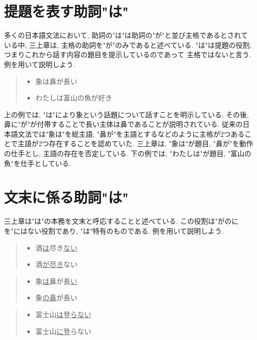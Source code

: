 \documentclass{jreport}
\begin{document}
\section{提題を表す助詞"は"}
多くの日本語文法において, 助詞の"は"は助詞の"が"と並び主格であるとされている中, 
三上章は, 主格の助詞を"が"のみであると述べている. "は"は提題の役割, つまりこれから話す内容の題目を提示しているのであって
主格ではないと言う. 例を用いて説明しよう.
\begin{quote}
 \begin{itemize}
  \item 象は鼻が長い
  \item わたしは富山の魚が好き
 \end{itemize}
\end{quote}
上の例では, "は"により象という話題について話すことを明示している. 
その後, 鼻に"が"が付帯することで長い主体は鼻であることが説明されている.
従来の日本語文法では"象は"を総主語, "鼻が"を主語とするなどのように主格が2つあることで主語が2つ存在することを認めていた.
三上章は, "象は"が題目, "鼻が"を動作の仕手とし, 主語の存在を否定している. 
下の例では, "わたしは"が題目, "富山の魚"を仕手としている.

\section{文末に係る助詞"は"}
三上章は"は"の本務を文末と呼応することと述べている.
この役割は"がのにを"にはない役割であり, "は"特有のものである.
例を用いて説明しよう.

\begin{quote}
 \begin{itemize}
  \item 酒\underline{は}尽き\underline{ない}
  \item 酒\underline{が}\underline{尽き}ない
 \end{itemize}
\end{quote}

\begin{quote}
 \begin{itemize}
  \item 象\underline{は}鼻が長\underline{い}
  \item 象\underline{の}\underline{鼻}が長い
 \end{itemize}
\end{quote}
\begin{quote}
 \begin{itemize}
  \item 富士山\underline{は}登\underline{らない}
  \item 富士山\underline{に}\underline{登}らない
 \end{itemize}
\end{quote}
\end{document}
